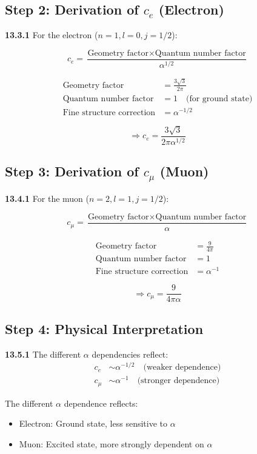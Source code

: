 \subsection{Step 2: Derivation of $c_e$ (Electron)}

\noindent \textbf{13.3.1} For the electron ($n=1, l=0, j=1/2$):

\[
c_e = \frac{\text{Geometry factor} \times \text{Quantum number factor}}{\alpha^{1/2}}
\]

\begin{align*}
	\text{Geometry factor} &= \frac{3\sqrt{3}}{2\pi} \\
	\text{Quantum number factor} &= 1 \quad \text{(for ground state)} \\
	\text{Fine structure correction} &= \alpha^{-1/2}
\end{align*}

\[
\Rightarrow c_e = \frac{3\sqrt{3}}{2\pi\alpha^{1/2}}
\]

\subsection{Step 3: Derivation of $c_\mu$ (Muon)}

\noindent \textbf{13.4.1} For the muon ($n=2, l=1, j=1/2$):

\[
c_\mu = \frac{\text{Geometry factor} \times \text{Quantum number factor}}{\alpha}
\]

\begin{align*}
	\text{Geometry factor} &= \frac{9}{4\pi} \\
	\text{Quantum number factor} &= 1 \\
	\text{Fine structure correction} &= \alpha^{-1}
\end{align*}

\[
\Rightarrow c_\mu = \frac{9}{4\pi\alpha}
\]

\subsection{Step 4: Physical Interpretation}

\noindent \textbf{13.5.1} The different $\alpha$ dependencies reflect:
\begin{align*}
	c_e &\sim \alpha^{-1/2} \quad \text{(weaker dependence)} \\
	c_\mu &\sim \alpha^{-1} \quad \text{(stronger dependence)}
\end{align*}

The different $\alpha$ dependence reflects:
\begin{itemize}
	\item Electron: Ground state, less sensitive to $\alpha$
	\item Muon: Excited state, more strongly dependent on $\alpha$
\end{itemize}

